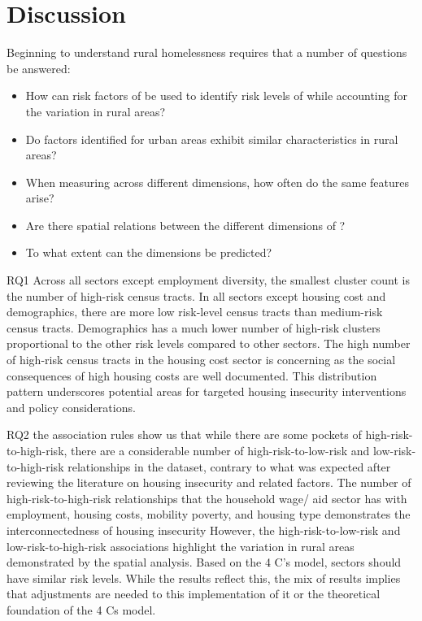 \chapter{Discussion}	

Beginning to understand rural homelessness requires that a number of questions be answered:
\begin{itemize}
    \item How can risk factors of  be used to identify risk levels of \hs while accounting for the variation in rural areas? 
    \item Do \hs factors identified for urban areas exhibit similar characteristics in rural areas? 
    \item When measuring \hs across different dimensions, how often do the same features arise?
    \item Are there spatial relations between the different dimensions of \hs? 
    \item To what extent can the \hs dimensions be predicted? 
\end{itemize}

RQ1 Across all sectors except employment diversity, the smallest cluster count is the number of high-risk census tracts. In all sectors except housing cost and demographics, there are more low risk-level census tracts than medium-risk census tracts. Demographics has a much lower number of high-risk clusters proportional to the other risk levels compared to other sectors. The high number of high-risk census tracts in the housing cost sector is concerning as the social consequences of high housing costs are well documented. This distribution pattern underscores potential areas for targeted housing insecurity interventions and policy considerations. 

RQ2 the association rules show us that while there are some pockets of high-risk-to-high-risk, there are a considerable number of high-risk-to-low-risk and low-risk-to-high-risk relationships in the dataset, contrary to what was expected after reviewing the literature on housing insecurity and related factors. The number of high-risk-to-high-risk relationships that the household wage/ aid sector has with employment, housing costs, mobility poverty, and housing type demonstrates the interconnectedness of housing insecurity However, the high-risk-to-low-risk and low-risk-to-high-risk associations highlight the variation in rural areas demonstrated by the spatial analysis. Based on the 4 C’s model, sectors should have similar risk levels. While the results reflect this, the mix of results implies that adjustments are needed to this implementation of it or the theoretical foundation of the 4 Cs model.  

